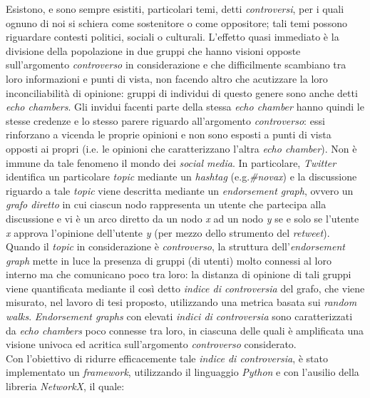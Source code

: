\documentclass[trieste,12pt]{toptesi}
\begin{document}
\sommario
Esistono, e sono sempre esistiti, particolari temi, detti \textit{controversi}, per i quali ognuno di noi si schiera come sostenitore o come oppositore; tali temi possono riguardare contesti politici, sociali o culturali. L'effetto quasi immediato è la divisione della popolazione in due gruppi che hanno visioni opposte sull'argomento \textit{controverso} in considerazione e che difficilmente scambiano tra loro informazioni e punti di vista, non facendo altro che acutizzare la loro inconciliabilità di opinione: gruppi di individui di questo genere sono anche detti \textit{echo chambers}. Gli invidui facenti parte della stessa \textit{echo chamber} hanno quindi le stesse credenze e lo stesso parere riguardo all'argomento \textit{controverso}: essi rinforzano a vicenda le proprie opinioni e non sono esposti a punti di vista opposti ai propri (i.e. le opinioni che caratterizzano l'altra \textit{echo chamber}). Non è immune da tale fenomeno il mondo dei \textit{social media}. In particolare, \textit{Twitter} identifica un particolare \textit{topic} mediante un \textit{hashtag} (e.g.\textit{\#novax}) e la discussione riguardo a tale \textit{topic} viene descritta mediante un \textit{endorsement graph}, ovvero un \textit{grafo diretto} in cui ciascun nodo rappresenta un utente che partecipa alla discussione e vi è un arco diretto da un nodo \textit{x} ad un nodo \textit{y} se e solo se l'utente \textit{x} approva l'opinione dell'utente \textit{y} (per mezzo dello strumento del \textit{retweet}). Quando il \textit{topic} in considerazione è \textit{controverso}, la struttura dell'\textit{endorsement graph} mette in luce la presenza di gruppi (di utenti) molto connessi al loro interno ma che comunicano poco tra loro: la distanza di opinione di tali gruppi viene quantificata mediante il così detto \textit{indice di controversia} del grafo, che viene misurato, nel lavoro di tesi proposto, utilizzando una metrica basata sui \textit{random walks}. \textit{Endorsement graphs} con elevati \textit{indici di controversia} sono caratterizzati da \textit{echo chambers} poco connesse tra loro, in ciascuna delle quali è amplificata una visione univoca ed acritica sull'argomento \textit{controverso} considerato.\\Con l'obiettivo di ridurre efficacemente tale \textit{indice di controversia}, è stato implementato un \textit{framework}, utilizzando il linguaggio \textit{Python} e con l'ausilio della libreria \textit{NetworkX}, il quale:
\end{document}
